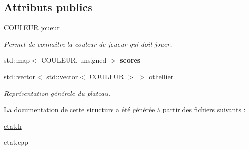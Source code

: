 \subsection*{Attributs publics}
\begin{DoxyCompactItemize}
\item 
C\+O\+U\+L\+E\+UR \hyperlink{structEtat_a0f6ef7f21d75e5a2c216fba4da8eadf5}{joueur}\hypertarget{structEtat_a0f6ef7f21d75e5a2c216fba4da8eadf5}{}\label{structEtat_a0f6ef7f21d75e5a2c216fba4da8eadf5}

\begin{DoxyCompactList}\small\item\em Permet de connaitre la couleur de joueur qui doit jouer. \end{DoxyCompactList}\item 
std\+::map$<$ C\+O\+U\+L\+E\+UR, unsigned $>$ {\bfseries scores}\hypertarget{structEtat_adbf6b7995516b31b79d0f176aed8e58a}{}\label{structEtat_adbf6b7995516b31b79d0f176aed8e58a}

\item 
std\+::vector$<$ std\+::vector$<$ C\+O\+U\+L\+E\+UR $>$ $>$ \hyperlink{structEtat_aaeff32b606c827277a5503e05188dfa4}{othellier}\hypertarget{structEtat_aaeff32b606c827277a5503e05188dfa4}{}\label{structEtat_aaeff32b606c827277a5503e05188dfa4}

\begin{DoxyCompactList}\small\item\em Représentation générale du plateau. \end{DoxyCompactList}\end{DoxyCompactItemize}


La documentation de cette structure a été générée à partir des fichiers suivants \+:\begin{DoxyCompactItemize}
\item 
\hyperlink{etat_8h}{etat.\+h}\item 
etat.\+cpp\end{DoxyCompactItemize}
